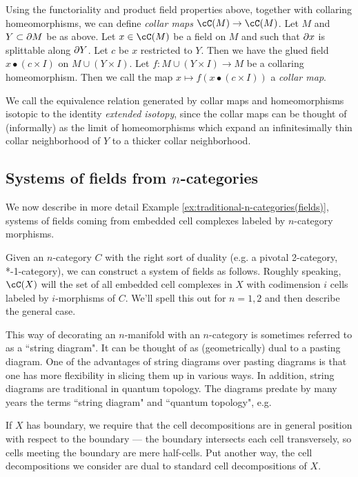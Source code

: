 Using the functoriality and product field properties above, together
with collaring homeomorphisms, we can define 
{\it collar maps} $\cC(M)\to \cC(M)$.
Let $M$ and $Y \subset \partial M$ be as above.
Let $x \in \cC(M)$ be a field on $M$ and such that $\partial x$ is splittable along $\partial Y$.
Let $c$ be $x$ restricted to $Y$.
Then we have the glued field $x \bullet (c\times I)$ on $M \cup (Y\times I)$.
Let $f: M \cup (Y\times I) \to M$ be a collaring homeomorphism.
Then we call the map $x \mapsto f(x \bullet (c\times I))$ a {\it collar map}.

We call the equivalence relation generated by collar maps and
homeomorphisms isotopic to the identity {\it extended isotopy}, since the collar maps
can be thought of (informally) as the limit of homeomorphisms
which expand an infinitesimally thin collar neighborhood of $Y$ to a thicker
collar neighborhood.




\subsection{Systems of fields from \texorpdfstring{$n$}{n}-categories}
\label{sec:example:traditional-n-categories(fields)}
We now describe in more detail Example \ref{ex:traditional-n-categories(fields)}, 
systems of fields coming from embedded cell complexes labeled
by $n$-category morphisms.

Given an $n$-category $C$ with the right sort of duality
(e.g. a pivotal 2-category, *-1-category),
we can construct a system of fields as follows.
Roughly speaking, $\cC(X)$ will the set of all embedded cell complexes in $X$
with codimension $i$ cells labeled by $i$-morphisms of $C$.
We'll spell this out for $n=1,2$ and then describe the general case.

This way of decorating an $n$-manifold with an $n$-category is sometimes referred to
as a ``string diagram".
It can be thought of as (geometrically) dual to a pasting diagram.
One of the advantages of string diagrams over pasting diagrams is that one has more
flexibility in slicing them up in various ways.
In addition, string diagrams are traditional in quantum topology.
The diagrams predate by many years the terms ``string diagram" and 
``quantum topology", e.g. \cite{MR0281657,MR776784} %

If $X$ has boundary, we require that the cell decompositions are in general
position with respect to the boundary --- the boundary intersects each cell
transversely, so cells meeting the boundary are mere half-cells.
Put another way, the cell decompositions we consider are dual to standard cell
decompositions of $X$.

